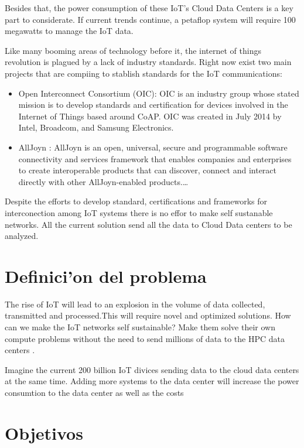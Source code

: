 Besides that, the power consumption of these  IoT’s Cloud Data Centers is a key
part to considerate. If current trends continue, a petaflop system will require 
100 megawatts to manage the IoT data. 

Like many booming areas of technology before it, the internet of things
revolution is plagued by a lack of industry standards. Right now exist two main 
projects that are compiing to stablish standards for the IoT communications: 

\begin{itemize}
\item Open Interconnect Consortium (OIC): OIC is an industry group whose stated 
mission is to develop standards and certification for devices involved in the 
Internet of Things based around CoAP. OIC was created in July 2014 by Intel, 
Broadcom, and Samsung Electronics.
\item AllJoyn : AllJoyn is an open, universal, secure and programmable software 
connectivity and services framework that enables companies and enterprises to 
create interoperable products that can discover, connect and interact directly 
with other AllJoyn-enabled products.\ldots
\end{itemize}

Despite the efforts to develop standard, certifications and frameworks for 
interconection among IoT systems there is no effor to make self sustanable 
networks. All the current solution send all the data to Cloud Data centers to be 
analyzed. 

\section{Definici'on del problema}
\noindent

The rise of IoT will lead to an explosion in the volume of data collected, 
transmitted and processed.This will require novel and optimized solutions. 
How can we make the IoT networks self sustainable? Make them solve their own compute problems 
without the need to send millions of data to the HPC data centers . 

Imagine the current 200 billion IoT divices sending data to the cloud data 
centers at the same time. Adding more systems to the data center will increase 
the power consumtion to the data center as well as the costs


\section{Objetivos}
\noindent


